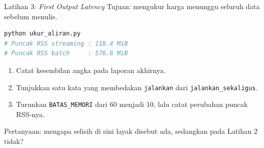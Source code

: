 \documentclass[aspectratio=169, table, 12pt]{beamer}
\begin{document}
\begin{frame}[fragile]{{\Large Latihan 3: \textit{First Output Latency}}}
  \vspace{2pt}
  {\small Tujuan: mengukur harga menunggu seluruh data sebelum menulis.}

  \vspace{2pt}
\begin{lstlisting}[language=bash]
python ukur_aliran.py
# Puncak RSS streaming : 118.4 MiB
# Puncak RSS batch     : 576.8 MiB
\end{lstlisting}

  \vspace{3pt}
  \begin{enumerate}\small
    \item Catat kesembilan angka pada laporan akhirnya.
    \item Tunjukkan satu kata yang membedakan \texttt{jalankan} dari
          \texttt{jalankan\_sekaligus}.
    \item Turunkan \texttt{BATAS\_MEMORI} dari 60 menjadi 10, lalu catat
          perubahan puncak RSS-nya.
  \end{enumerate}

  \vspace{3pt}
  {\small Pertanyaan: mengapa selisih di sini layak disebut ada, sedangkan pada
  Latihan 2 tidak?}
\end{frame}
\end{document}
